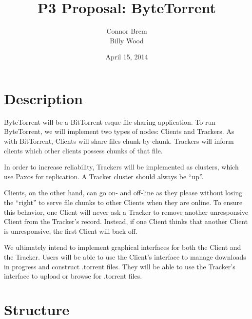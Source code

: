 \documentclass[12pt]{article}
\title{P3 Proposal: ByteTorrent}
\author{Connor Brem\\Billy Wood}
\date{April 15, 2014}
\begin{document}
\maketitle


\section*{Description}

ByteTorrent will be a BitTorrent-esque file-sharing application.
To run ByteTorrent, we will implement two types of nodes: Clients and Trackers.
As with BitTorrent, Clients will share files chunk-by-chunk. Trackers will
inform clients which other clients possess chunks of that file.

In order to increase reliability, Trackers will be implemented as clusters,
which use Paxos for replication. A Tracker cluster should always be ``up''.

Clients, on the other hand, can go on- and off-line as they please without
losing the ``right'' to serve file chunks to other Clients when they are online.
To ensure this behavior, one Client will never ask a Tracker to remove another
unresponsive Client from the Tracker's record. Instead, if one Client thinks
that another Client is unresponsive, the first Client will back off.

We ultimately intend to implement graphical interfaces for both
the Client and the Tracker.
Users will be able to use the Client's interface to manage downloads in
progress and construct .torrent files. They will be able to use the Tracker's
interface to upload or browse for .torrent files.


\section*{Structure}
\end{document}

